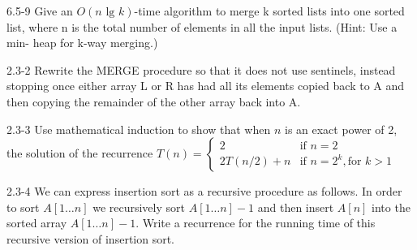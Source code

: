 \begin{problem}{6.5-9}
  Give an $O(n \text{ lg }k)$-time algorithm to merge k sorted lists into one sorted list, where n is the total number of elements in
  all the input lists. (Hint: Use a min- heap for k-way merging.)
\end{problem}

\begin{problem}{2.3-2}
  Rewrite the MERGE procedure so that it does not use sentinels, instead stopping once either array L or R has had all its
  elements copied back to A and then copying the remainder of the other array back into A.
\end{problem}

\begin{problem}{2.3-3}
Use mathematical induction to show that when $n$ is an exact power of 2, the solution of the recurrence
  $T(n) = \begin{cases}
    2 & \text{if } n = 2 \\
    2T(n/2) + n & \text{if } n = 2^k, \text{for } k >1
  \end{cases}
  $
\end{problem}

\begin{problem}{2.3-4}
  We can express insertion sort as a recursive procedure as follows. In order to sort $A[1\ldots n]$ we recursively sort
  $A[1\ldots n] - 1 $ and then insert $A[n]$ into the sorted array $A[1\ldots n] - 1 $.
  Write a recurrence for the running time of this recursive version of insertion sort.
\end{problem}


